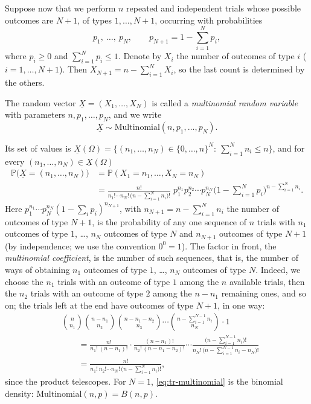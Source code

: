 Suppose now that we perform $n$ repeated and independent trials whose possible outcomes are
$N+1$, of types $1,\dots,N+1$, occurring with probabilities
\[
  p_1,\ \dots,\ p_N,\qquad p_{N+1}=1-\sum_{i=1}^Np_i ,
\]
where $p_i\ge0$ and $\sum_{i=1}^Np_i\le1$. Denote by $X_i$ the number of outcomes of type $i$
($i=1,\dots,N+1$). Then $X_{N+1}=n-\sum_{i=1}^NX_i$, so the last count is determined by the
others.

\begin{definition}\label{def:tr-multinomial}
The random vector $\underline X=(X_1,\dots,X_N)$ is called a \emph{multinomial random variable}
with parameters $n,p_1,\dots,p_N$, and we write
\[
  \underline X\sim\mathrm{Multinomial}(n,p_1,\dots,p_N).
\]
\end{definition}

Its set of values is
$\underline X(\Omega)=\{(n_1,\dots,n_N)\in\{0,\dots,n\}^N:\ \sum_{i=1}^Nn_i\le n\}$, and for every
$(n_1,\dots,n_N)\in\underline X(\Omega)$
\begin{equation}\label{eq:tr-multinomial}
\begin{aligned}
  \mathbb P\big(\underline X=(n_1,\dots,n_N)\big)
  &=\mathbb P(X_1=n_1,\dots,X_N=n_N)\\
  &=\frac{n!}{n_1!\cdots n_N!\,\big(n-\sum_{i=1}^Nn_i\big)!}\;
    p_1^{n_1}p_2^{n_2}\cdots p_N^{n_N}\Big(1-\sum_{i=1}^Np_i\Big)^{n-\sum_{i=1}^Nn_i}.
\end{aligned}
\end{equation}
Here $p_1^{n_1}\cdots p_N^{n_N}(1-\sum_ip_i)^{n_{N+1}}$, with $n_{N+1}=n-\sum_{i=1}^Nn_i$ the
number of outcomes of type $N+1$, is the probability of any one sequence of $n$ trials with $n_1$
outcomes of type $1$, \dots, $n_N$ outcomes of type $N$ and $n_{N+1}$ outcomes of type $N+1$
(by independence; we use the convention $0^0=1$). The factor in front, the
\emph{multinomial coefficient}, is the number of such sequences, that is, the number of ways of
obtaining $n_1$ outcomes of type $1$, \dots, $n_N$ outcomes of type $N$. Indeed, we choose the
$n_1$ trials with an outcome of type $1$ among the $n$ available trials, then the $n_2$ trials
with an outcome of type $2$ among the $n-n_1$ remaining ones, and so on; the trials left at the
end have outcomes of type $N+1$, in one way:
\[
\begin{aligned}
  &\binom n{n_1}\binom{n-n_1}{n_2}\binom{n-n_1-n_2}{n_3}\cdots\binom{n-\sum_{i=1}^{N-1}n_i}{n_N}\cdot1\\
  &\qquad=\frac{n!}{n_1!\,(n-n_1)!}\cdot\frac{(n-n_1)!}{n_2!\,(n-n_1-n_2)!}\cdots
    \frac{\big(n-\sum_{i=1}^{N-1}n_i\big)!}{n_N!\,\big(n-\sum_{i=1}^{N-1}n_i-n_N\big)!}\\
  &\qquad=\frac{n!}{n_1!\,n_2!\cdots n_N!\,\big(n-\sum_{i=1}^Nn_i\big)!},
\end{aligned}
\]
since the product telescopes. For $N=1$, \eqref{eq:tr-multinomial} is the binomial density:
$\mathrm{Multinomial}(n,p)=B(n,p)$.

